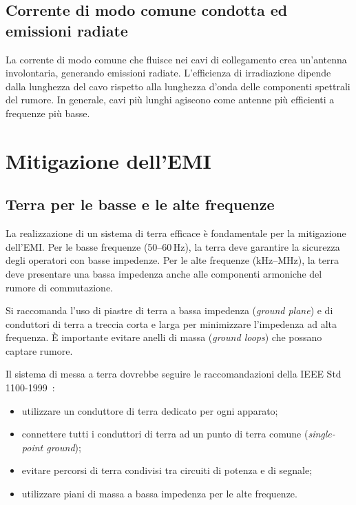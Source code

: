 \subsection{Corrente di modo comune condotta ed emissioni radiate}

La corrente di modo comune che fluisce nei cavi di collegamento crea un'antenna involontaria, generando emissioni radiate. L'efficienza di irradiazione dipende dalla lunghezza del cavo rispetto alla lunghezza d'onda delle componenti spettrali del rumore. In generale, cavi più lunghi agiscono come antenne più efficienti a frequenze più basse.

\section{Mitigazione dell'EMI}

\subsection{Terra per le basse e le alte frequenze}

La realizzazione di un sistema di terra efficace è fondamentale per la mitigazione dell'EMI. Per le basse frequenze (50--60\,Hz), la terra deve garantire la sicurezza degli operatori con basse impedenze. Per le alte frequenze (kHz--MHz), la terra deve presentare una bassa impedenza anche alle componenti armoniche del rumore di commutazione.

Si raccomanda l'uso di piastre di terra a bassa impedenza (\textit{ground plane}) e di conduttori di terra a treccia corta e larga per minimizzare l'impedenza ad alta frequenza. È importante evitare anelli di massa (\textit{ground loops}) che possano captare rumore.

Il sistema di messa a terra dovrebbe seguire le raccomandazioni della IEEE Std 1100-1999~\cite{ieee1100}:

\begin{itemize}
\item utilizzare un conduttore di terra dedicato per ogni apparato;
\item connettere tutti i conduttori di terra ad un punto di terra comune (\textit{single-point ground});
\item evitare percorsi di terra condivisi tra circuiti di potenza e di segnale;
\item utilizzare piani di massa a bassa impedenza per le alte frequenze.
\end{itemize}

